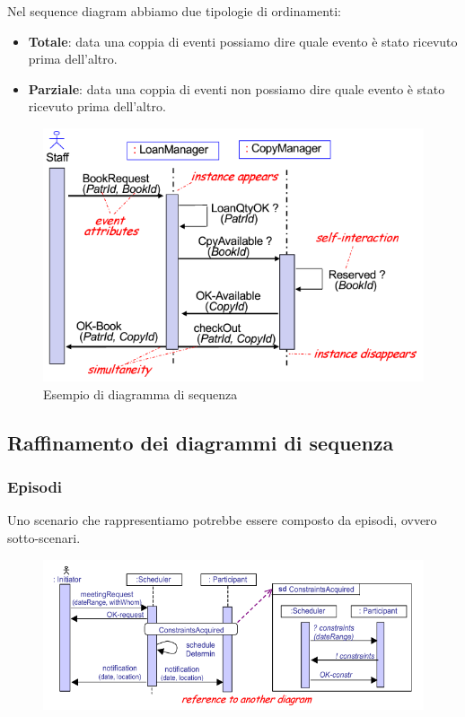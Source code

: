Nel sequence diagram abbiamo due tipologie di ordinamenti:
\begin{itemize}
    \item \textbf{Totale}: data una coppia di eventi possiamo dire quale evento è
    stato ricevuto prima dell'altro.
    \item \textbf{Parziale}: data una coppia di eventi non possiamo dire quale evento
    è stato ricevuto prima dell'altro.
\end{itemize}
\begin{figure}[H]
    \centering
    \includegraphics[scale=0.5]{img/sequence-ex.png}
    \caption{Esempio di diagramma di sequenza}
\end{figure}
\subsection{Raffinamento dei diagrammi di sequenza}
\subsubsection{Episodi}
Uno scenario che rappresentiamo potrebbe essere composto
da episodi, ovvero sotto-scenari.
\begin{figure}[H]
    \centering
    \includegraphics[scale=0.5]{img/sequence-episode.png}
\end{figure}


